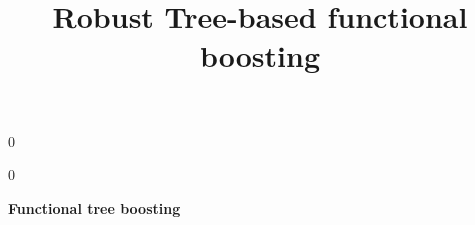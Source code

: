 \documentclass[authoryear,12pt]{article}
\newcommand{\blind}{0}
\begin{document}


\def\spacingset#1{\renewcommand{\baselinestretch}%
{#1}\small\normalsize} \spacingset{1}



\blind
{
  \title{\bf Robust Tree-based functional boosting}
  \maketitle
} \fi

\blind
{
  \bigskip
  \bigskip
  \bigskip
  \begin{center}
    {\LARGE\bf Functional tree boosting}
\end{center}
  \medskip
} \fi


\spacingset{1.5} %





\newpage

\end{document}

